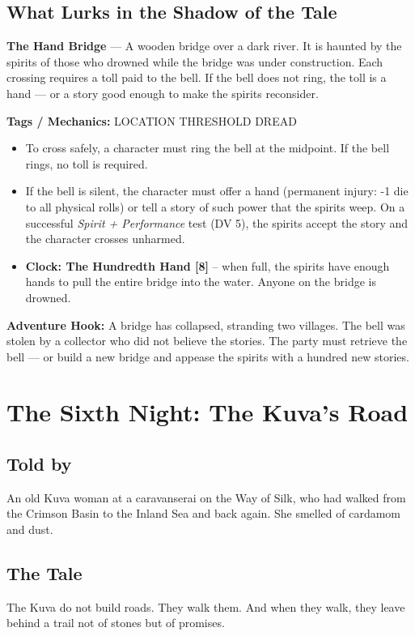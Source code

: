 \documentclass[10pt,twoside]{book}
\newcommand{\tag}[1]{\textsc{#1}}
\begin{document}
\section*{What Lurks in the Shadow of the Tale}
\begin{infobox}
\textbf{The Hand Bridge} --- A wooden bridge over a dark river. It is haunted by the spirits of those who drowned while the bridge was under construction. Each crossing requires a toll paid to the bell. If the bell does not ring, the toll is a hand --- or a story good enough to make the spirits reconsider.

\textbf{Tags / Mechanics:} \tag{LOCATION} \tag{THRESHOLD} \tag{DREAD}

\begin{itemize}
\item To cross safely, a character must ring the bell at the midpoint. If the bell rings, no toll is required.
\item If the bell is silent, the character must offer a hand (permanent injury: -1 die to all physical rolls) or tell a story of such power that the spirits weep. On a successful \textit{Spirit + Performance} test (DV 5), the spirits accept the story and the character crosses unharmed.
\item \textbf{Clock: The Hundredth Hand [8]} -- when full, the spirits have enough hands to pull the entire bridge into the water. Anyone on the bridge is drowned.
\end{itemize}

\textbf{Adventure Hook:} A bridge has collapsed, stranding two villages. The bell was stolen by a collector who did not believe the stories. The party must retrieve the bell --- or build a new bridge and appease the spirits with a hundred new stories.
\end{infobox}

\chapter{The Sixth Night: The Kuva's Road}

\section*{Told by}
An old Kuva woman at a caravanserai on the Way of Silk, who had walked from the Crimson Basin to the Inland Sea and back again. She smelled of cardamom and dust.

\section*{The Tale}
The Kuva do not build roads. They walk them. And when they walk, they leave behind a trail not of stones but of promises.
\end{document}
